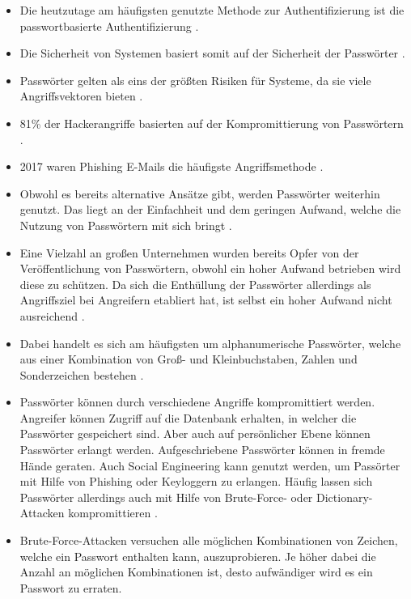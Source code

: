\begin{itemize}
    \item Die heutzutage am häufigsten genutzte Methode zur Authentifizierung ist die passwortbasierte Authentifizierung \cite{chanda2016password} \cite{boonkrong2012security} \cite{yildirim2019encouraging}.
    \item Die Sicherheit von Systemen basiert somit auf der Sicherheit der Passwörter \cite{boonkrong2012security}.
    \item Passwörter gelten als eins der größten Risiken für Systeme, da sie viele Angriffsvektoren bieten \cite{yildirim2019encouraging} \cite{farke2020you}.
    \item 81\% der Hackerangriffe basierten auf der Kompromittierung von Passwörtern \cite{barbosa2021provable}. 
    \item 2017 waren Phishing E-Mails die häufigste Angriffsmethode \cite{barbosa2021provable}.
    \item Obwohl es bereits alternative Ansätze gibt, werden Passwörter weiterhin genutzt. Das liegt an der Einfachheit und dem geringen Aufwand, welche die Nutzung von Passwörtern mit sich bringt \cite{yildirim2019encouraging}.
    \item Eine Vielzahl an großen Unternehmen wurden bereits Opfer von der Veröffentlichung von Passwörtern, obwohl ein hoher Aufwand betrieben wird diese zu schützen. Da sich die Enthüllung der Passwörter allerdings als Angriffsziel bei Angreifern etabliert hat, ist selbst ein hoher Aufwand nicht ausreichend \cite{boonkrong2012security}.
    \item Dabei handelt es sich am häufigsten um alphanumerische Passwörter, welche aus einer Kombination von Groß- und Kleinbuchstaben, Zahlen und Sonderzeichen bestehen \cite{chanda2016password}. 
    \item Passwörter können durch verschiedene Angriffe kompromittiert werden. Angreifer können Zugriff auf die Datenbank erhalten, in welcher die Passwörter gespeichert sind. Aber auch auf persönlicher Ebene können Passwörter erlangt werden. Aufgeschriebene Passwörter können in fremde Hände geraten. Auch Social Engineering kann genutzt werden, um Passörter mit Hilfe von Phishing oder Keyloggern zu erlangen. Häufig lassen sich Passwörter allerdings auch mit Hilfe von Brute-Force- oder Dictionary-Attacken kompromittieren \cite{chanda2016password} \cite{morii2017research}.
    \item Brute-Force-Attacken versuchen alle möglichen Kombinationen von Zeichen, welche ein Passwort enthalten kann, auszuprobieren. Je höher dabei die Anzahl an möglichen Kombinationen ist, desto aufwändiger wird es ein Passwort zu erraten.

\end{itemize}
